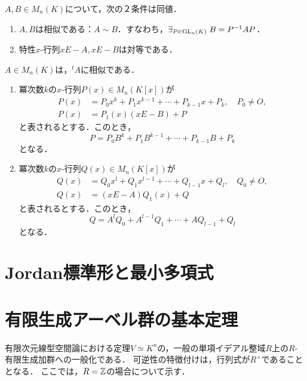 \documentclass[uplatex,dvipdfmx]{jsreport}
\begin{document}
\begin{theorem}
    $A,B\in M_n(K)$について，次の２条件は同値．
    \begin{enumerate}
        \item $A,B$は相似である：$A\sim B$．すなわち，$\exists_{P\in\mathrm{GL}_n(K)}\;B=P^{-1}AP$．
        \item 特性$x$-行列$xE-A,xE-B$は対等である．
    \end{enumerate}
\end{theorem}

\begin{corollary}
    $A\in M_n(K)$は，${}^t\!A$に相似である．
\end{corollary}

\begin{proposition}\mbox{}
    \begin{enumerate}
        \item 冪次数$k$の$x$-行列$P(x)\in M_n(K[x])$が
        \begin{align*}
            P(x)&=P_0x^k+P_1x^{k-1}+\cdots+P_{k-1}x+P_k,\quad P_0\ne O,\\
            P(x)&=P_1(x)(xE-B)+P
        \end{align*}
        と表されるとする．このとき，
        \[P=P_0B^k+P_1B^{k-1}+\cdots+P_{k-1}B+P_k\]
        となる．
        \item 冪次数$k$の$x$-行列$Q(x)\in M_n(K[x])$が
        \begin{align*}
            Q(x)&=Q_0x^l+Q_1x^{l-1}+\cdots+Q_{l-1}x+Q_l,\quad Q_0\ne O,\\
            Q(x)&=(xE-A)Q_1(x)+Q
        \end{align*}
        と表されるとする．このとき，
        \[Q=A^lQ_0+A^{l-1}Q_1+\cdots+AQ_{l-1}+Q_l\]
        となる．
    \end{enumerate}
\end{proposition}

\section{Jordan標準形と最小多項式}

\section{有限生成アーベル群の基本定理}

\begin{tcolorbox}[colframe=ForestGreen, colback=ForestGreen!10!white,breakable,colbacktitle=ForestGreen!40!white,coltitle=black,fonttitle=\bfseries\sffamily,
title=]
    有限次元線型空間論における定理$V\simeq K^n$の，一般の単項イデアル整域$R$上の$R$-有限生成加群への一般化である．
    可逆性の特徴付けは，行列式が$R^\times$であることとなる．
    ここでは，$R=\mathbb{Z}$の場合について示す．
\end{tcolorbox}
\end{document}
